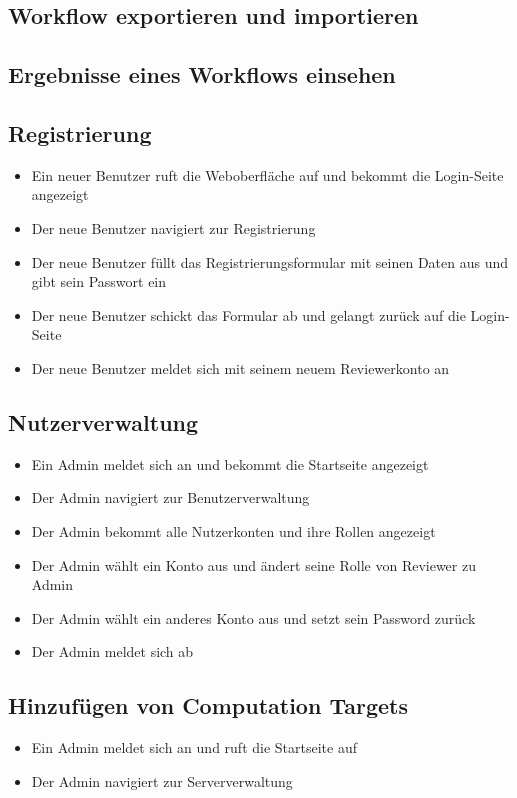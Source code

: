 \subsection*{Workflow exportieren und importieren}

\subsection*{Ergebnisse eines Workflows einsehen}


\subsection*{Registrierung}
\begin{itemize}
    \item Ein neuer Benutzer ruft die Weboberfläche auf und bekommt die Login-Seite angezeigt
    \item Der neue Benutzer navigiert zur Registrierung
    \item Der neue Benutzer füllt das Registrierungsformular mit seinen Daten aus und gibt sein Passwort ein
    \item Der neue Benutzer schickt das Formular ab und gelangt zurück auf die Login-Seite
    \item Der neue Benutzer meldet sich mit seinem neuem \Gls{Reviewer}konto an
\end{itemize}

\subsection*{Nutzerverwaltung}
\begin{itemize}
    \item Ein \Gls{Admin} meldet sich an und bekommt die Startseite angezeigt
    \item Der \Gls{Admin} navigiert zur Benutzerverwaltung
    \item Der \Gls{Admin} bekommt alle Nutzerkonten und ihre Rollen angezeigt
    \item Der \Gls{Admin} wählt ein Konto aus und ändert seine Rolle von \Gls{Reviewer} zu \Gls{Admin}
    \item Der \Gls{Admin} wählt ein anderes Konto aus und setzt sein Password zurück
    \item Der \Gls{Admin} meldet sich ab
\end{itemize}

\subsection*{Hinzufügen von Computation Targets}
\begin{itemize}
    \item Ein \Gls{Admin} meldet sich an und ruft die Startseite auf
    \item Der \Gls{Admin} navigiert zur Serververwaltung
\end{itemize}
